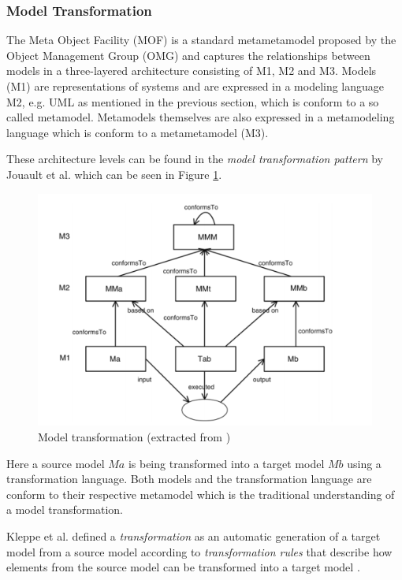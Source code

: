 \subsubsection{Model Transformation}
\label{subsubsec:modeltrans}
The Meta Object Facility (MOF) \cite{omg2013mof} is a standard metametamodel proposed by the Object Management Group (OMG) and captures the relationships between models in a three-layered architecture consisting of M1, M2 and M3. Models (M1) are representations of systems and are expressed in a modeling language M2, e.g. UML as mentioned in the previous section, which is conform to a so called metamodel. Metamodels themselves are also expressed in a metamodeling language which is conform to a metametamodel (M3). 

These architecture levels can be found in the \textit{model transformation pattern} by Jouault et al. \cite{modeltrans} which can be seen in Figure \ref{fig:metametamodel}. 

\begin{figure}[H]
\centering
\includegraphics[width=\textwidth]{pictures/metametamodel.png}
\caption{Model transformation (extracted from \cite{modeltrans})}
\label{fig:metametamodel}
\end{figure}

Here a source model $Ma$ is being transformed into a target model $Mb$ using a transformation language. Both models and the transformation language are conform to their respective metamodel which is the traditional understanding of a model transformation.

Kleppe et al. defined a \textit{transformation} as an automatic generation of a target model from a source model according to \textit{transformation rules} that describe how elements from the source model can be transformed into a target model \cite{Kleppe:2003:MEM:829557}. 

